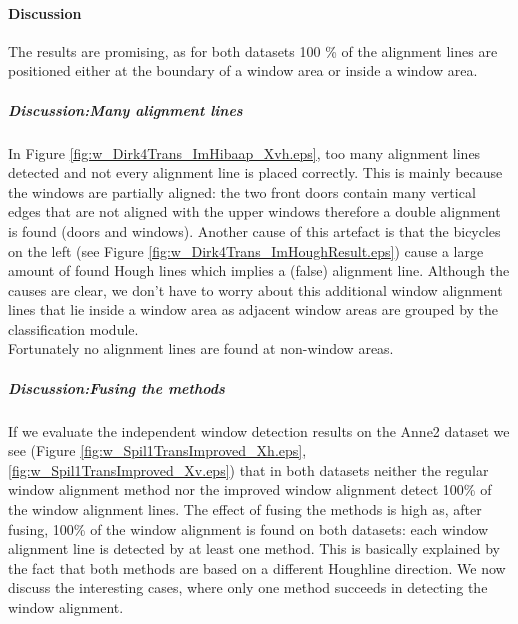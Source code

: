 \paragraph{Discussion}
The results are promising, as for both datasets 100 \% of the alignment lines
are positioned either at the boundary of a window area or inside a window area.

\subparagraph{Discussion:Many alignment lines}
In Figure \ref{fig:w_Dirk4Trans_ImHibaap_Xvh.eps}, too many alignment lines
detected and not every alignment line is placed correctly.  This is mainly
because the windows are partially aligned: the two front doors contain many
vertical edges that are not aligned with the upper windows therefore a double alignment
is found (doors and windows).  Another cause of this artefact is that the
bicycles on the left (see Figure \ref{fig:w_Dirk4Trans_ImHoughResult.eps}) cause
a large amount of found Hough lines which implies a (false) alignment line.
Although the causes are clear, we don't have to worry about this additional
window alignment lines that lie inside a window area as adjacent window areas
are grouped by the classification module.\\
Fortunately no alignment lines are found at non-window areas.


\subparagraph{Discussion:Fusing the methods}
If we evaluate the independent window detection results on the Anne2 dataset we see (Figure
\ref{fig:w_Spil1TransImproved_Xh.eps}, \ref{fig:w_Spil1TransImproved_Xv.eps})
that in both datasets neither the regular window alignment method nor the
improved window alignment detect 100\% of the window alignment lines.  The
effect of fusing the methods is high as, after fusing, 100\% of the window
alignment is found on both datasets: each window alignment line is detected by
at least one method.  This is basically explained by the fact that both methods
are based on a different Houghline direction.  We now discuss the interesting
cases, where only one method succeeds in detecting the window alignment.\\

